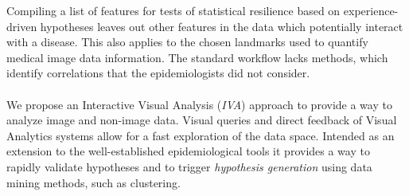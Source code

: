 \documentclass[journal]{style/vgtc} 			          %
\begin{document}
Compiling a list of features for tests of statistical resilience based on experience-driven hypotheses leaves out other features in the data which potentially interact with a disease.
%
This also applies to the chosen landmarks used to quantify medical image data information.
%
The standard workflow lacks methods, which identify correlations that the epidemiologists did not consider.
%
%
%
%
\\\\
We propose an Interactive Visual Analysis (\emph{IVA}) approach \cite{Thomas2005} to provide a way to analyze image and non-image data.
%
Visual queries and direct feedback of Visual Analytics systems allow for a fast exploration of the data space.
%
Intended as an extension to the well-established epidemiological tools it provides a way to rapidly validate hypotheses and to trigger \emph{hypothesis generation} using data mining methods, such as clustering.
\end{document}
